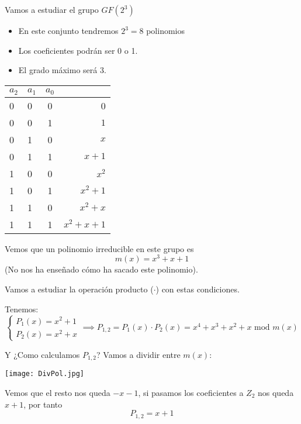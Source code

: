  \begin{example}
 	Vamos a estudiar el grupo $GF(2^3)$
 	\begin{itemize}
 		\item En este conjunto tendremos $2^3 = 8$ polinomios
 		\item Los coeficientes podrán ser 0 o 1.
 		\item El grado máximo será 3.
 	\end{itemize}
 	
 	\begin{center}
 		\begin{tabular}{l | l | c  r}
 			$a_2$ & $a_1$ & $a_0$ &   \\
 			\hline
 			0  & 0 & 0 & 0 \\
 			\hline
 			0  & 0 & 1 & $1$ \\
 			\hline
 			0 & 1 & 0 & $x$ \\
 			\hline
 			0 & 1 & 1 & $x +1$\\
 			\hline
 			1 & 0 & 0 & $x^2$\\
 			\hline
 			1 & 0 &  1 & $x^2 +1$\\
 			\hline
 			1 & 1 & 0 & $x^2 +x$\\
 			\hline
 			1 & 1 & 1 & $x^2 +x +1$
 		\end{tabular}
 	\end{center}
 	
 	Vemos que un polinomio irreducible en este grupo es
 	$$m(x) = x^3 +x +1$$
	(No nos ha enseñado cómo ha sacado este polinomio).
	
	Vamos a estudiar la operación producto ($\cdot$) con estas condiciones.
	
	Tenemos:
	$$\begin{cases}
	P_1(x) = x^2 +1\\
	P_2(x) = x^2 +x
	\end{cases} \implies P_{1,2} = P_1(x) \cdot P_2(x) = x^4 + x^3 + x^2 + x \text{ mod }m(x) $$
	
	Y ¿Como calculamos $P_{1,2}$?
	Vamos a dividir entre $m(x)$:
	
	\begin{center}
		\texttt{[image: DivPol.jpg]}
	\end{center}
	
	Vemos que el resto nos queda $-x -1$, si pasamos los coeficientes a $Z_2$ nos queda $x+1$, por tanto 
	$$P_{1,2} = x+1$$
		
 \end{example}
 
